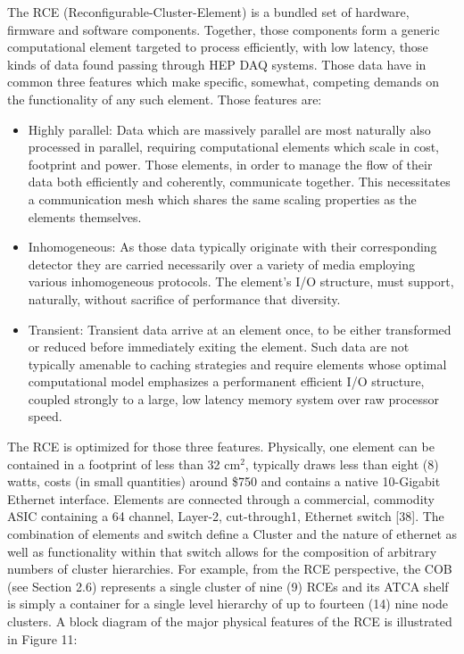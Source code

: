 The RCE (Reconfigurable-Cluster-Element) is a bundled set of hardware, firmware and software components. Together, those components form a generic computational element targeted to process efficiently, with low latency, those kinds of data found passing through HEP DAQ systems. Those data have in common three features which make specific, somewhat, competing demands on the functionality of any such element. Those features are:
\begin{itemize}
\item Highly parallel: Data which are massively parallel are most naturally also processed in parallel, requiring computational elements which scale in cost,   footprint and power. Those elements, in order to manage the flow of their data both efficiently and coherently, communicate together. This necessitates a communication mesh which shares the same scaling properties as the elements themselves.
\item Inhomogeneous: As those data typically originate with their corresponding detector they are carried necessarily over a variety of media employing various inhomogeneous protocols. The element's I/O structure, must support, naturally, without sacrifice of performance that diversity.
\item Transient:
Transient data arrive at an element once, to be either transformed or reduced before immediately exiting the element. Such data are not typically amenable to caching strategies and require elements whose optimal computational model emphasizes a performanent efficient I/O structure, coupled strongly to a large, low latency memory system over raw processor speed.
\end{itemize}
The RCE is optimized for those three features. Physically, one element can be contained in a footprint of less than 32 cm$^2$, typically draws less than eight (8) watts, costs (in small quantities) around \$750 and contains a native 10-Gigabit Ethernet interface. Elements are connected through a commercial, commodity ASIC containing a 64 channel, Layer-2, cut-through1, Ethernet switch [38]. The combination of elements and switch define a Cluster and the nature of ethernet as well as functionality within that switch allows for the composition of arbitrary numbers of cluster hierarchies. For example, from the RCE perspective, the COB (see Section 2.6) represents a single cluster of nine (9) RCEs and its ATCA shelf is simply a container for a single level hierarchy of up to fourteen (14) nine node clusters. A block diagram of the major physical features of the RCE is illustrated in Figure 11:


